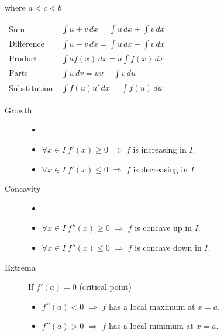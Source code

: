 where $a<c<b$
\hformbar




\begin{center}
  \begin{tabular}{ll}
  Sum           & $\int u+v\,dx = \int u\,dx + \int v\,dx$  \\
  Difference    & $\int u-v\,dx = \int u\,dx - \int v\,dx$  \\
  Product       & $\int af(x)\,dx = a\int f(x)\,dx$         \\
  Parts         & $\int u\,dv = uv - \int v\,du$            \\
  Substitution  & $\int f(u)u'\,dx = \int f(u)\,du$
  \end{tabular}
\end{center}
\hformbar




\flushleft
			\begin{description}
				\item[Growth]
				      \begin{itemize}
					      \item[]
					      \item $\forall x\in I\ f'(x)\geq 0$ $\Rightarrow$ $f$ is increasing in $I$.
					      \item $\forall x\in I\ f'(x)\leq 0$ $\Rightarrow$ $f$ is decreasing in $I$.
				      \end{itemize}
				\item[Concavity]
				      \begin{itemize}
					      \item[]
					      \item $\forall x\in I\ f''(x)\geq 0$ $\Rightarrow$ $f$ is concave up in $I$.
					      \item $\forall x\in I\ f''(x)\leq 0$ $\Rightarrow$ $f$ is concave down in $I$.
				      \end{itemize}
				\item[Extrema] If $f'(a)=0$ (critical point)
				      \begin{itemize}
					      \item $f''(a)<0$ $\Rightarrow$ $f$ has a local maximum at $x=a$.
					      \item $f''(a)>0$ $\Rightarrow$ $f$ has a local minimum at $x=a$.
				      \end{itemize}
			\end{description}

